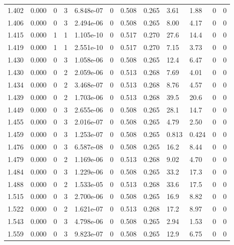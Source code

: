 \documentclass[preview]{standalone}
\begin{document}
{{{{\begin{tabular}{L{1.2cm}C{1.2cm} C{0.3cm}C{0.5cm} C{1.4cm}C{1.4cm} C{1.4cm}C{1.4cm} C{1.6cm}C{1.6cm} C{1.6cm}C{1.6cm}}
  1.402  &  0.000  & 0     &  3 &  6.848e-07  & 0  &  0.508&   0.265& 3.61 & 1.88   &  0 & 0  \\ 
  1.406  &  0.000  & 0     &  3 &  2.494e-06  & 0  &  0.508&   0.265& 8.00 & 4.17   &  0 & 0  \\ 
  1.415  &  0.000  & 1     &  1 &  1.105e-10  & 0  &  0.517&   0.270& 27.6 & 14.4   &  0 & 0  \\ 
  1.419  &  0.000  & 1     &  1 &  2.551e-10  & 0  &  0.517&   0.270& 7.15 & 3.73   &  0 & 0  \\ 
  1.430  &  0.000  & 0     &  3 &  1.058e-06  & 0  &  0.508&   0.265& 12.4 & 6.47   &  0 & 0  \\ 
  1.430  &  0.000  & 0     &  2 &  2.059e-06  & 0  &  0.513&   0.268& 7.69 & 4.01   &  0 & 0  \\ 
  1.434  &  0.000  & 0     &  2 &  3.468e-07  & 0  &  0.513&   0.268& 8.76 & 4.57   &  0 & 0  \\ 
  1.439  &  0.000  & 0     &  2 &  1.703e-06  & 0  &  0.513&   0.268& 39.5 & 20.6   &  0 & 0  \\ 
  1.449  &  0.000  & 0     &  3 &  2.655e-06  & 0  &  0.508&   0.265& 28.1 & 14.7   &  0 & 0  \\ 
  1.455  &  0.000  & 0     &  3 &  2.016e-07  & 0  &  0.508&   0.265& 4.79 & 2.50   &  0 & 0  \\ 
  1.459  &  0.000  & 0     &  3 &  1.253e-07  & 0  &  0.508&   0.265& 0.813 & 0.424   &  0 & 0  \\ 
  1.476  &  0.000  & 0     &  3 &  6.587e-08  & 0  &  0.508&   0.265& 16.2 & 8.44   &  0 & 0  \\ 
  1.479  &  0.000  & 0     &  2 &  1.169e-06  & 0  &  0.513&   0.268& 9.02 & 4.70   &  0 & 0  \\ 
  1.484  &  0.000  & 0     &  3 &  1.229e-06  & 0  &  0.508&   0.265& 33.2 & 17.3   &  0 & 0  \\ 
  1.488  &  0.000  & 0     &  2 &  1.533e-05  & 0  &  0.513&   0.268& 33.6 & 17.5   &  0 & 0  \\ 
  1.515  &  0.000  & 0     &  3 &  2.700e-06  & 0  &  0.508&   0.265& 16.9 & 8.82   &  0 & 0  \\ 
  1.522  &  0.000  & 0     &  2 &  1.621e-07  & 0  &  0.513&   0.268& 17.2 & 8.97   &  0 & 0  \\ 
  1.543  &  0.000  & 0     &  3 &  4.798e-06  & 0  &  0.508&   0.265& 2.94 & 1.53   &  0 & 0  \\ 
  1.559  &  0.000  & 0     &  3 &  9.823e-07  & 0  &  0.508&   0.265& 12.9 & 6.75   &  0 & 0  \\ 

\end{tabular}}}}}
\end{document}
